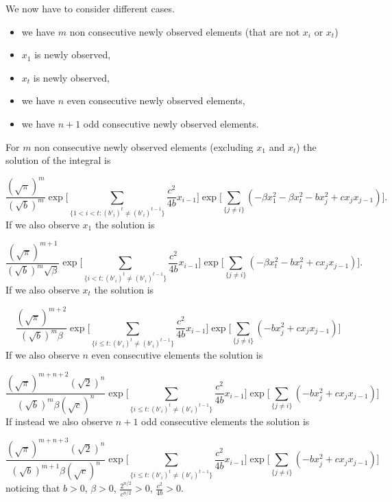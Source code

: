 \documentclass[11pt,a4paper]{article}
\begin{document}
We now have to consider different cases. 

\begin{itemize}
    \item we have $m$ non consecutive newly observed elements (that are not $x_i$ or $x_t$)
    \item $x_1$ is newly observed,
    \item $x_t$ is newly observed,
    \item we have $n$ even consecutive newly observed elements,
    \item we have $n+1$ odd consecutive newly observed elements.
\end{itemize}
For $m$ non consecutive newly observed elements (excluding $x_1$ and $x_t$) the solution of the integral is

\[
    \frac{(\sqrt{\pi})^m}{(\sqrt{b})^m} \exp \Bigg[ \sum_{\{ 1 < i < t : (b'_i)^t \neq (b'_i)^{t-1}\}} \frac{c^2}{4 b} x_{i-1}\Bigg]\exp \Bigg[ \sum_{\{ j \neq i\}} (- \beta x^2_1 -\beta x^2_t - b x^2_j + c x_j x_{j-1})\Bigg].
\]
If we also observe $x_1$ the solution is

\[
    \frac{(\sqrt{\pi})^{m+1}}{(\sqrt{b})^m \sqrt{\beta}} \exp \Bigg[ \sum_{\{ i < t : (b'_i)^t \neq (b'_i)^{t-1}\}} \frac{c^2}{4 b} x_{i-1}\Bigg] \exp \Bigg[ \sum_{\{ j \neq i\}} (- \beta x^2_t- b x^2_i + c x_j x_{j-1})\Bigg].
\]
If we also observe $x_t$ the solution is

\[
    \frac{(\sqrt{\pi})^{m+2}}{(\sqrt{b})^m \beta} \exp \Bigg[ \sum_{\{ i \leq t : (b'_i)^t \neq (b'_i)^{t-1}\}} \frac{c^2}{4 b} x_{i-1}\Bigg] \exp \Bigg[ \sum_{\{ j \neq i\}} (- b x^2_j + c x_j x_{j-1})\Bigg]
\]
If we also observe $n$ even consecutive elements the solution is

\[
    \frac{(\sqrt{\pi})^{m+n+2} (\sqrt{2})^n}{(\sqrt{b})^m \beta(\sqrt{c})^n} \exp \Bigg[ \sum_{\{ i \leq t : (b'_i)^t \neq (b'_i)^{t-1}\}} \frac{c^2}{4 b} x_{i-1}\Bigg] \exp \Bigg[ \sum_{\{ j \neq i\}} (- b x^2_j + c x_j x_{j-1})\Bigg]
\]
If instead we also observe $n+1$ odd consecutive elements the solution is

\[
    \frac{(\sqrt{\pi})^{m+n+3} (\sqrt{2})^n}{(\sqrt{b})^{m+1} \beta(\sqrt{c})^n} \exp \Bigg[ \sum_{\{ i \leq t : (b'_i)^t \neq (b'_i)^{t-1}\}} \frac{c^2}{4 b} x_{i-1}\Bigg] \exp \Bigg[ \sum_{\{ j \neq i\}} (- b x^2_j + c x_j x_{j-1})\Bigg]
\]
noticing that $b > 0$, $\beta > 0$, $\frac{2^{n/2}}{c^{n/2}} > 0$, $\frac{c^2}{4 b} > 0$.
\end{document}
